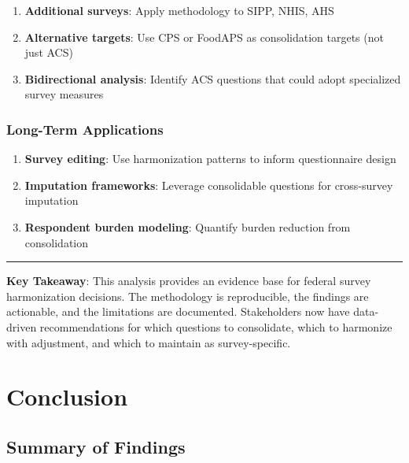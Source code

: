 \documentclass[
  letterpaper,
]{report}
\providecommand{\tightlist}{%
  \setlength{\itemsep}{0pt}\setlength{\parskip}{0pt}}
\begin{document}
\begin{enumerate}
\def\labelenumi{\arabic{enumi}.}
\tightlist
\item
  \textbf{Additional surveys}: Apply methodology to SIPP, NHIS, AHS
\item
  \textbf{Alternative targets}: Use CPS or FoodAPS as consolidation
  targets (not just ACS)
\item
  \textbf{Bidirectional analysis}: Identify ACS questions that could
  adopt specialized survey measures
\end{enumerate}

\subsection{Long-Term Applications}\label{long-term-applications}

\begin{enumerate}
\def\labelenumi{\arabic{enumi}.}
\tightlist
\item
  \textbf{Survey editing}: Use harmonization patterns to inform
  questionnaire design
\item
  \textbf{Imputation frameworks}: Leverage consolidable questions for
  cross-survey imputation
\item
  \textbf{Respondent burden modeling}: Quantify burden reduction from
  consolidation
\end{enumerate}

\begin{center}\rule{0.5\linewidth}{0.5pt}\end{center}

\textbf{Key Takeaway}: This analysis provides an evidence base for
federal survey harmonization decisions. The methodology is reproducible,
the findings are actionable, and the limitations are documented.
Stakeholders now have data-driven recommendations for which questions to
consolidate, which to harmonize with adjustment, and which to maintain
as survey-specific.


\chapter{Conclusion}\label{conclusion}

\section{Summary of Findings}\label{summary-of-findings}
\end{document}
